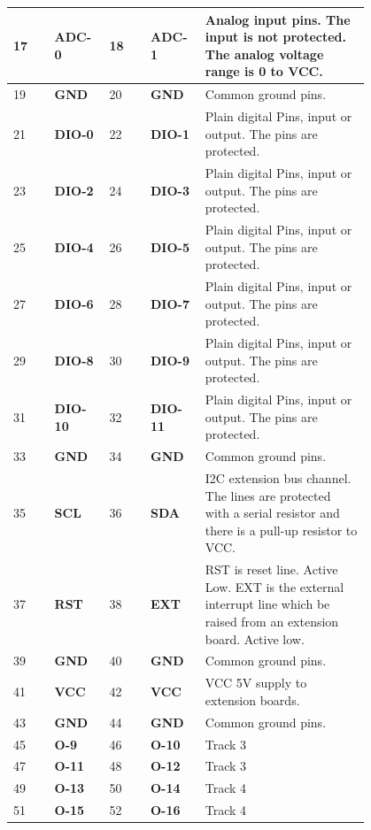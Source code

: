 \begin{longtable}{@{}|p{0.1\linewidth}|p{0.1\linewidth}|p{0.1\linewidth}|p{0.1\linewidth}|p{0.4\linewidth}|@{}}
    \midrule
    17 & \textbf{ADC-0} & 18 & \textbf{ADC-1} & Analog input pins. The input is not protected. The analog voltage range is 0 to VCC. \\
    \midrule
    19 & \textbf{GND} & 20 & \textbf{GND} & Common ground pins. \\
    \midrule
    21 & \textbf{DIO-0} & 22 & \textbf{DIO-1} & Plain digital Pins, input or output. The pins are protected. \\
    \midrule
    23 & \textbf{DIO-2} & 24 & \textbf{DIO-3} & Plain digital Pins, input or output. The pins are protected. \\
    \midrule
    25 & \textbf{DIO-4} & 26 & \textbf{DIO-5} & Plain digital Pins, input or output. The pins are protected. \\
    \midrule
    27 & \textbf{DIO-6} & 28 & \textbf{DIO-7} & Plain digital Pins, input or output. The pins are protected. \\
    \midrule
    29 & \textbf{DIO-8} & 30 & \textbf{DIO-9} & Plain digital Pins, input or output. The pins are protected. \\
    \midrule
    31 & \textbf{DIO-10} & 32 & \textbf{DIO-11} & Plain digital Pins, input or output. The pins are protected. \\
    \midrule
    33 & \textbf{GND} & 34 & \textbf{GND} & Common ground pins. \\
    \midrule
    35 & \textbf{SCL} & 36 & \textbf{SDA} & I2C extension bus channel.  The lines are protected with a serial resistor and there is a pull-up resistor to VCC. \\
    \midrule
    37 & \textbf{RST} & 38 & \textbf{EXT} & RST is reset line. Active Low. EXT is the external interrupt line which be raised from an extension board. Active low. \\
    \midrule
    39 & \textbf{GND} & 40 & \textbf{GND} & Common ground pins. \\
    \midrule
    41 & \textbf{VCC} & 42 & \textbf{VCC} & VCC 5V supply to extension boards. \\
    \midrule
    43 & \textbf{GND} & 44 & \textbf{GND} & Common ground pins. \\
    \midrule
    45 & \textbf{O-9} & 46 & \textbf{O-10} & Track 3 \\
    \midrule
    47 & \textbf{O-11} & 48 & \textbf{O-12} & Track 3 \\
    \midrule
    49 & \textbf{O-13} & 50 & \textbf{O-14} & Track 4 \\
    \midrule
    51 & \textbf{O-15} & 52 & \textbf{O-16} & Track 4 \\

\end{longtable}

